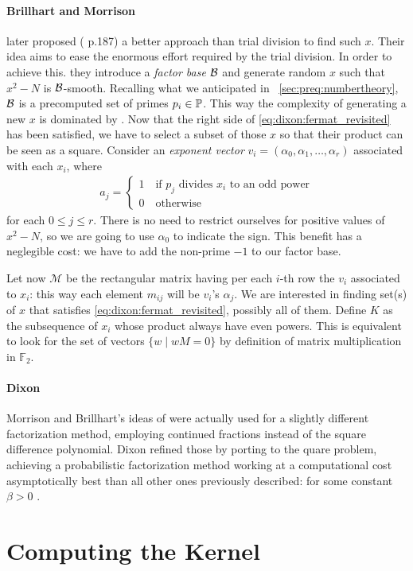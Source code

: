 \paragraph{Brillhart and Morrison} later proposed (\cite{morrison-brillhart}
p.187) a better approach than trial division to find such $x$. Their idea aims
to ease the enormous effort required by the trial division. In order to achieve
this. they introduce a \emph{factor base} $\mathcal{B}$ and generate random $x$
such that $x^2 - N$ is $\mathcal{B}$-smooth. Recalling what we anticipated in
~\ref{sec:preq:numbertheory}, $\mathcal{B}$ is a precomputed set of primes
$p_i \in \mathbb{P}$.
This way the complexity of generating a new $x$ is dominated by
\bigO{|\factorBase|}. Now that the right side of \ref{eq:dixon:fermat_revisited}
has been satisfied, we have to select a subset of those $x$ so that their
product can be seen as a square. Consider an \emph{exponent vector}
$v_i = (\alpha_0, \alpha_1, \ldots, \alpha_r)$ associated with each $x_i$, where
\begin{align*}
  a_j = \begin{cases}
    1 \quad \text{if $p_j$ divides $x_i$ to an odd power} \\
    0 \quad \text{otherwise}
    \end{cases}
\end{align*}
for each $0 \leq j \leq r $. There is no need to restrict ourselves for positive
values of $x^2 -N$, so we are going to use $\alpha_0$ to indicate the sign. This
benefit has a neglegible cost: we have to add the non-prime $-1$ to our factor
base.

Let now $\mathcal{M}$ be the rectangular matrix having per each $i$-th row the
$v_i$ associated to $x_i$: this way each element $m_{ij}$ will be $v_i$'s
$\alpha_j$. We are interested in finding set(s) of $x$ that satisfies
\ref{eq:dixon:fermat_revisited}, possibly all of them.
Define $K$ as the subsequence of $x_i$ whose product always have even powers.
This is equivalent to look for the set of vectors $\{ w \mid wM = 0 \}$ by
definition of matrix multiplication in $\mathbb{F}_2$.


\paragraph{Dixon} Morrison and Brillhart's ideas of \cite{morrison-brillhart}
were actually used for a slightly different factorization method, employing
continued fractions instead of the square difference polynomial. Dixon refined
those by porting to the quare problem, achieving a probabilistic factorization
method working at a computational cost asymptotically  best than all other ones
previously described:  for some
constant $\beta > 0$ \cite{dixon}.

\section{Computing the Kernel}

